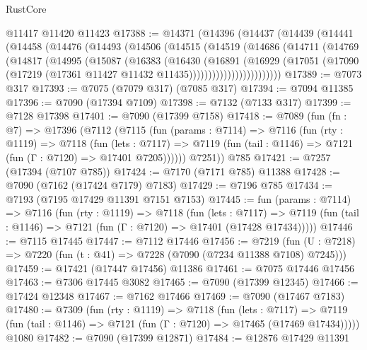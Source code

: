 \begin{lexlean}{RustCore}
\begin{coremodule}
    @11417
    @11420
    @11423
@17388 := @14371
    (@14396
      (@14437
        (@14439
          (@14441
            (@14458
              (@14476
                (@14493
                  (@14506
                    (@14515
                      (@14519
                        (@14686
                          (@14711
                            (@14769
                              (@14817
                                (@14995
                                  (@15087
                                    (@16383
                                      (@16430
                                        (@16891
                                          (@16929
                                            (@17051
                                              (@17090
                                                (@17219
                                                  (@17361
                                                    @11427
                                                    @11432
                                                    @11435))))))))))))))))))))))))
@17389 := @7073 @317
@17393 := @7075 (@7079 @317) (@7085 @317)
@17394 := @7094 @11385
@17396 := @7090 (@17394 @7109)
@17398 := @7132 (@7133 @317)
@17399 := @7128 @17398
@17401 := @7090 (@17399 @7158)
@17418 := @7089
    (fun (fn : @7) =>
    @17396
      (@7112
        (@7115
          (fun (params : @7114) =>
          @7116
            (fun (rty : @1119) =>
            @7118
              (fun (lets : @7117) =>
              @7119 (fun (tail : @1146) => @7121 (fun (Γ : @7120) => @17401 @7205))))))
        @7251))
    @785
@17421 := @7257 (@17394 (@7107 @785))
@17424 := @7170 (@7171 @785) @11388
@17428 := @7090 (@7162 (@17424 @7179) @7183)
@17429 := @7196 @785
@17434 := @7193 (@7195 @17429 @11391 @7151 @7153)
@17445 := fun (params : @7114) =>
  @7116
    (fun (rty : @1119) =>
    @7118
      (fun (lets : @7117) =>
      @7119 (fun (tail : @1146) => @7121 (fun (Γ : @7120) => @17401 (@17428 @17434)))))
@17446 := @7115 @17445
@17447 := @7112 @17446
@17456 := @7219
    (fun (U : @7218) => @7220 (fun (t : @41) => @7228 (@7090 (@7234 @11388 @7108) @7245)))
@17459 := @17421 (@17447 @17456) @11386
@17461 := @7075 @17446 @17456
@17463 := @7306 @17445 @3082
@17465 := @7090 (@17399 @12345)
@17466 := @17424 @12348
@17467 := @7162 @17466
@17469 := @7090 (@17467 @7183)
@17480 := @7309
    (fun (rty : @1119) =>
    @7118
      (fun (lets : @7117) =>
      @7119 (fun (tail : @1146) => @7121 (fun (Γ : @7120) => @17465 (@17469 @17434)))))
    @1080
@17482 := @7090 (@17399 @12871)
@17484 := @12876 @17429 @11391

\end{coremodule}
\end{lexlean}
